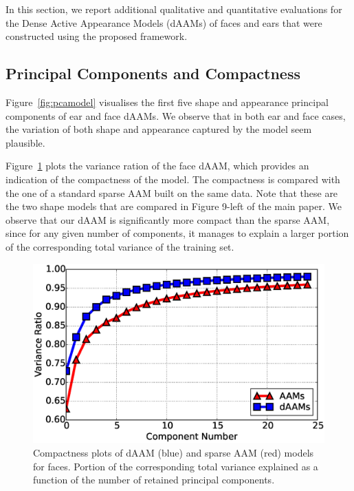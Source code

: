 In this section, we report additional qualitative and quantitative evaluations for the Dense Active Appearance Models (dAAMs) of faces and ears that were constructed using the proposed framework.



\subsection{Principal Components and Compactness}



Figure~\ref{fig:pcamodel} visualises the first five shape and appearance principal components of ear and face dAAMs. We observe that in both ear and face cases, the variation of both shape and appearance captured by the model seem plausible.


Figure~\ref{fig:compact} plots the variance ration of the face dAAM, which provides an indication of the compactness of the model. The compactness is compared with the one of a standard sparse AAM built on the same data. Note that these are the two shape models that are compared in Figure 9-left of the main paper. We observe that our dAAM is significantly more compact than the sparse AAM, since for any given number of components, it manages to explain a larger portion of the corresponding total variance of the training set. 


\begin{figure}[!t]
    \centering
    \includegraphics[width=\columnwidth]{resources/Suplementory_Meterial/Model_Analysis/cumu_var_ratio}
    \caption{Compactness plots of dAAM (blue) and sparse AAM (red) models for faces. Portion of the corresponding total variance explained as a function of the number of retained principal components.}
    \label{fig:compact}
\end{figure}

